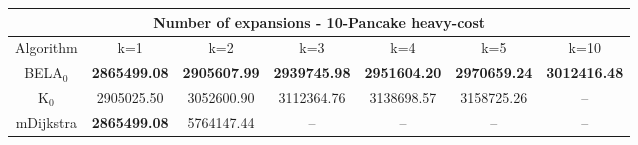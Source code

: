 \begin{tabular}{c|cccccc}\toprule
\multicolumn{7}{c}{Number of expansions - 10-Pancake heavy-cost}\\ \midrule
Algorithm & k=1 & k=2 & k=3 & k=4 & k=5 & k=10 \\ \midrule
BELA$_0$ & \textbf{2865499.08} & \textbf{2905607.99} & \textbf{2939745.98} & \textbf{2951604.20} & \textbf{2970659.24} & \textbf{3012416.48} \\
K$_0$ & 2905025.50 & 3052600.90 & 3112364.76 & 3138698.57 & 3158725.26 & -- \\
mDijkstra & \textbf{2865499.08} & 5764147.44 & -- & -- & -- & -- \\ \bottomrule 
\end{tabular}
